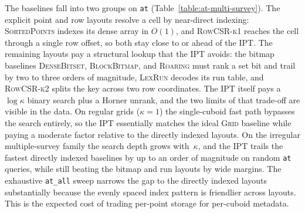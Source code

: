 \documentclass[manuscript,screen,review]{acmart}
\theoremstyle{definition}
\theoremstyle{plain}
\begin{document}
\begin{table}[ht]
\caption{Per-scenario \texttt{at\_random} cost on the
  multiple-survey scenarios (\texttt{c0r1e1l0}, EPYC~9454 reference
  platform, mean across the 5 repetitions).
  The ratios are relative to the \textsc{IPT} ns/\texttt{at} cell in the
  same column. Bold ratios indicate results strictly faster than
  \textsc{IPT}. Grey rows are dominated by \textsc{IPT} on every
  scenario. Cells marked $^{\dagger}$ have, or depend on a cell with,
  per-cell repetition spread $(p_{90}-p_{10})/\mathrm{mean}$ above
  $20\%$ and should be read as approximate. Cells marked \texttt{--}
  indicate the layout was not measured on that scenario (large 3D
  scenarios exceed the bitmap baselines' memory budget).}
\label{table:at-multi-survey}

\end{table}

The baselines fall into two groups on \texttt{at}
(Table~\ref{table:at-multi-survey}). The explicit point and row
layouts resolve a cell by near-direct indexing: \textsc{SortedPoints}
indexes its dense array in $O(1)$, and \textsc{RowCSR-k1} reaches the
cell through a single row offset, so both stay close to or ahead of
the IPT. The remaining layouts pay a structural lookup that the IPT
avoids: the bitmap baselines \textsc{DenseBitset}, \textsc{BlockBitmap},
and \textsc{Roaring} must rank a set bit and trail by two to three
orders of magnitude, \textsc{LexRun} decodes its run table, and
\textsc{RowCSR-k2} splits the key across two row coordinates. The IPT
itself pays a $\log\kappa$ binary search plus a Horner unrank, and the
two limits of that trade-off are visible in the data. On regular grids
($\kappa = 1$) the single-cuboid fast path bypasses the search
entirely, so the IPT essentially matches the ideal \textsc{Grid}
baseline while paying a moderate factor relative to the directly
indexed layouts. On the irregular multiple-survey family the search
depth grows with~$\kappa$, and the IPT trails the fastest directly
indexed baselines by up to an order of magnitude on random \texttt{at}
queries, while still beating the bitmap and run layouts by wide
margins. The exhaustive \texttt{at\_all} sweep narrows the gap to the
directly indexed layouts substantially because the evenly spaced index
pattern is friendlier across layouts. This is the expected cost of
trading per-point storage for per-cuboid metadata.
\end{document}
